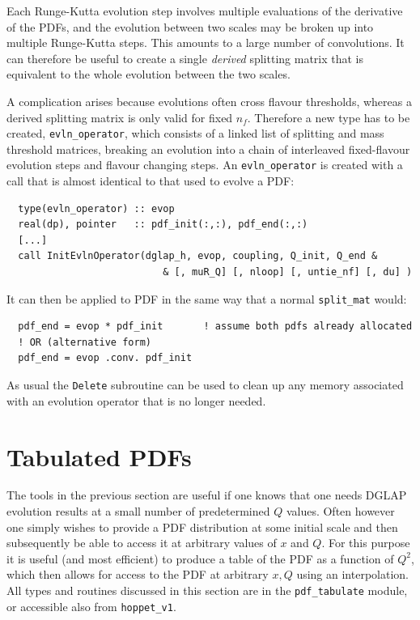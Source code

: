 \documentclass[12pt]{article}
\newcommand{\ttt}[1]{\texttt{#1}}
\begin{document}
Each Runge-Kutta evolution step involves multiple evaluations of the
derivative of the PDFs, and the evolution between two scales may be
broken up into multiple Runge-Kutta steps. This amounts to a large
number of convolutions. It can therefore be useful to create a single
\emph{derived} splitting matrix that is equivalent to the whole
evolution between the two scales. 

A complication arises because evolutions often cross flavour
thresholds, whereas a derived splitting matrix is only valid for fixed
$n_f$. Therefore a new type has to be created, \ttt{evln\_operator},
which consists of a linked list of splitting and mass threshold
matrices, breaking an evolution into a chain of interleaved
fixed-flavour evolution steps and flavour changing steps. An
\ttt{evln\_operator} is created with a call that is almost identical
to that used to evolve a PDF:
\begin{lstlisting}
  type(evln_operator) :: evop
  real(dp), pointer   :: pdf_init(:,:), pdf_end(:,:)
  [...]
  call InitEvlnOperator(dglap_h, evop, coupling, Q_init, Q_end &
                           & [, muR_Q] [, nloop] [, untie_nf] [, du] )
\end{lstlisting}
It can then be applied to PDF in the same way that a normal
\ttt{split\_mat} would:
\begin{lstlisting}
  pdf_end = evop * pdf_init       ! assume both pdfs already allocated
  ! OR (alternative form) 
  pdf_end = evop .conv. pdf_init  
\end{lstlisting}
As usual the \ttt{Delete} subroutine can be used to clean up any
memory associated with an evolution operator that is no longer needed.


\section{Tabulated PDFs}
\label{sec:tabulated-pdfs}

The tools in the previous section are useful if one knows that one
needs DGLAP evolution results at a small number of predetermined $Q$
values. Often however one simply wishes to provide a PDF distribution
at some initial scale and then subsequently be able to access it at
arbitrary values of $x$ and $Q$. For this purpose it is useful 
(and most efficient) to
produce a table of the PDF as a function of $Q^2$, which then allows
for access to the PDF at arbitrary $x, Q$ using an interpolation. All
types and routines discussed in this section are in the
\ttt{pdf\_tabulate} module, or accessible also from \ttt{hoppet\_v1}.
\end{document}
